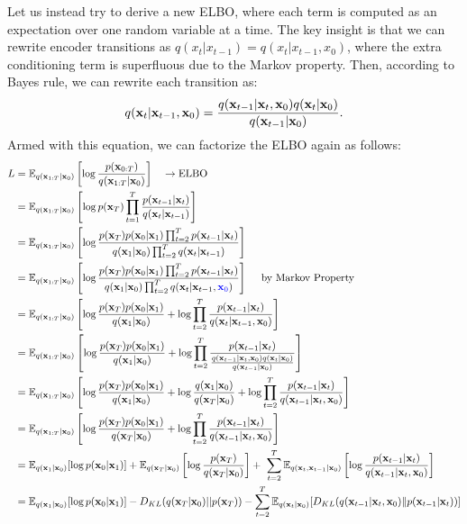 Let us instead try to derive a new ELBO, where each term is computed as an expectation over \textbfonly one random variable at a time. The key insight is that we can rewrite encoder transitions as $q(x_t|x_{t-1}) = q(x_t|x_{t-1}, x_0)$, where the extra conditioning term is superfluous due to the Markov property. Then, according to Bayes rule, we can rewrite each transition as:
\begin{align*}
	q({\mathbf{x}}_t|{\mathbf{x}}_{t-1}, {\mathbf{x}}_0)= \frac{q({\mathbf{x}}_{t-1}|{\mathbf{x}}_t, {\mathbf{x}}_0)q({\mathbf{x}}_t| {\mathbf{x}}_0)}{q({\mathbf{x}}_{t-1}| {\mathbf{x}}_0)}.
\end{align*}
Armed with this equation, we can factorize the ELBO again as follows:
\begin{align}
	L 
	&= \mathbb{E}_{q({\mathbf{x}}_{1:T}|{\mathbf{x}}_0)}\left[\log\frac{p({\mathbf{x}}_{0:T})}{q({\mathbf{x}}_{1:T}|{\mathbf{x}}_0)}\right] \quad \to \textrm{ELBO}\\		
	&= \mathbb{E}_{q({\mathbf{x}}_{1:T}|{\mathbf{x}}_0)}\left[\log p({\mathbf{x}}_T)\prod_{t=1}^T\frac{p({\mathbf{x}}_{t-1}|{\mathbf{x}}_t)}{q({\mathbf{x}}_{t}|{\mathbf{x}}_{t-1})}\right]\\
	&= \mathbb{E}_{q({\mathbf{x}}_{1:T}|{\mathbf{x}}_0)}\left[\log \frac{p({\mathbf{x}}_T)p({\mathbf{x}}_0|{\mathbf{x}}_{1})\prod_{t=2}^{T} p({\mathbf{x}}_{t-1}|{\mathbf{x}}_{t})}{q({\mathbf{x}}_1|{\mathbf{x}}_{0})\prod_{t=2}^{T}  q({\mathbf{x}}_{t}|{\mathbf{x}}_{t-1})}\right]\\
	&= \mathbb{E}_{q({\mathbf{x}}_{1:T}|{\mathbf{x}}_0)}\left[\log \frac{p({\mathbf{x}}_T)p({\mathbf{x}}_0|{\mathbf{x}}_{1})\prod_{t=2}^{T} p({\mathbf{x}}_{t-1}|{\mathbf{x}}_{t})}{q({\mathbf{x}}_1|{\mathbf{x}}_{0})\prod_{t=2}^{T}  q({\mathbf{x}}_{t}|{\mathbf{x}}_{t-1}, \textcolor{blue}{{\mathbf{x}}_0})}\right] \quad \textrm{ by Markov Property}\\
	&= \mathbb{E}_{q({\mathbf{x}}_{1:T}|{\mathbf{x}}_0)}\left[\log \frac{p({\mathbf{x}}_T)p({\mathbf{x}}_0|{\mathbf{x}}_{1})}{q({\mathbf{x}}_1|{\mathbf{x}}_{0})}+\log \prod_{t=2}^{T}\frac{ p({\mathbf{x}}_{t-1}|{\mathbf{x}}_{t})}{q({\mathbf{x}}_{t}|{\mathbf{x}}_{t-1}, {\mathbf{x}}_0)}\right]\\
	&= \mathbb{E}_{q({\mathbf{x}}_{1:T}|{\mathbf{x}}_0)}\left[\log \frac{p({\mathbf{x}}_T)p({\mathbf{x}}_0|{\mathbf{x}}_{1})}{q({\mathbf{x}}_1|{\mathbf{x}}_{0})}+\log \prod_{t=2}^{T}\frac{ p({\mathbf{x}}_{t-1}|{\mathbf{x}}_{t})}{\frac{q({\mathbf{x}}_{t-1}|{\mathbf{x}}_t, {\mathbf{x}}_0)q({\mathbf{x}}_t| {\mathbf{x}}_0)}{q({\mathbf{x}}_{t-1}| {\mathbf{x}}_0)}}\right]\\
	&= \mathbb{E}_{q({\mathbf{x}}_{1:T}|{\mathbf{x}}_0)}\left[\log \frac{p({\mathbf{x}}_T)p({\mathbf{x}}_0|{\mathbf{x}}_{1})}{q({\mathbf{x}}_1|{\mathbf{x}}_{0})}+\log \frac{q({\mathbf{x}}_1|{\mathbf{x}}_0)}{q({\mathbf{x}}_T|{\mathbf{x}}_0)}+\log \prod_{t=2}^{T}\frac{ p({\mathbf{x}}_{t-1}|{\mathbf{x}}_{t})}{q({\mathbf{x}}_{t-1}|{\mathbf{x}}_t, {\mathbf{x}}_0)}\right]\\
	&= \mathbb{E}_{q({\mathbf{x}}_{1:T}|{\mathbf{x}}_0)}\left[\log \frac{p({\mathbf{x}}_T)p({\mathbf{x}}_0|{\mathbf{x}}_{1})}{q({\mathbf{x}}_T|{\mathbf{x}}_{0})}+\log \prod_{t=2}^{T}\frac{ p({\mathbf{x}}_{t-1}|{\mathbf{x}}_{t})}{q({\mathbf{x}}_{t-1}|{\mathbf{x}}_t, {\mathbf{x}}_0)}\right]\\
	&= \mathbb{E}_{q({\mathbf{x}}_{1}|{\mathbf{x}}_0)}[\log p({\mathbf{x}}_0|{\mathbf{x}}_{1})]+\mathbb{E}_{q({\mathbf{x}}_{T}|{\mathbf{x}}_0)}\left[\log \frac{p({\mathbf{x}}_T)}{q({\mathbf{x}}_T|{\mathbf{x}}_{0})}\right]+\ \sum_{t=2}^{T}\mathbb{E}_{q({\mathbf{x}}_{t},{\mathbf{x}}_{t-1}|{\mathbf{x}}_0)}\left[\log\frac{ p({\mathbf{x}}_{t-1}|{\mathbf{x}}_{t})}{q({\mathbf{x}}_{t-1}|{\mathbf{x}}_t, {\mathbf{x}}_0)}\right]\\
	&= \mathbb{E}_{q({\mathbf{x}}_{1}|{\mathbf{x}}_0)}[\log p({\mathbf{x}}_0|{\mathbf{x}}_{1})]-D_{KL}(q({\mathbf{x}}_{T}|{\mathbf{x}}_0)||p({\mathbf{x}}_T))-\sum_{t=2}^{T}\mathbb{E}_{q({\mathbf{x}}_{t}|{\mathbf{x}}_0)}[D_{KL}(q({\mathbf{x}}_{t-1}|{\mathbf{x}}_t, {\mathbf{x}}_0)\|p({\mathbf{x}}_{t-1}|{\mathbf{x}}_{t}))]
\end{align}
